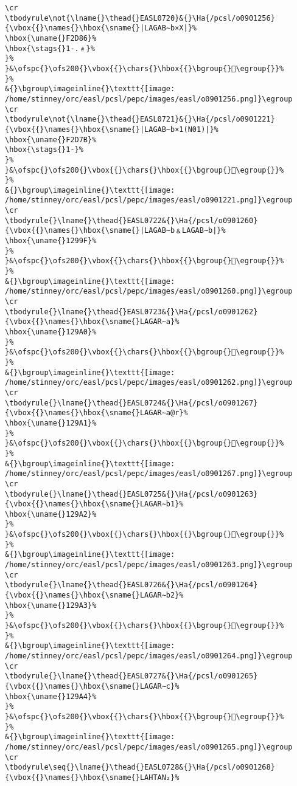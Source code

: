 \begin{verbatim}
\cr
\tbodyrule\not{\lname{}\thead{}EASL0720}&{}\Ha{/pcsl/o0901256}{\vbox{{}\names{}\hbox{\sname{}|LAGAB∼b×X|}%
\hbox{\uname{}F2D86}%
\hbox{\stags{}1-.﹟}%
}%
}&\ofspc{}\ofs200{}\vbox{{}\chars{}\hbox{{}\bgroup{}󲶆\egroup{}}%
}%
&{}\bgroup\imageinline{}\texttt{[image: /home/stinney/orc/easl/pcsl/pepc/images/easl/o0901256.png]}\egroup
\cr
\tbodyrule\not{\lname{}\thead{}EASL0721}&{}\Ha{/pcsl/o0901221}{\vbox{{}\names{}\hbox{\sname{}|LAGAB∼b×1(N01)|}%
\hbox{\uname{}F2D7B}%
\hbox{\stags{}1-}%
}%
}&\ofspc{}\ofs200{}\vbox{{}\chars{}\hbox{{}\bgroup{}󲵻\egroup{}}%
}%
&{}\bgroup\imageinline{}\texttt{[image: /home/stinney/orc/easl/pcsl/pepc/images/easl/o0901221.png]}\egroup
\cr
\tbodyrule{}\lname{}\thead{}EASL0722&{}\Ha{/pcsl/o0901260}{\vbox{{}\names{}\hbox{\sname{}|LAGAB∼b﹠LAGAB∼b|}%
\hbox{\uname{}1299F}%
}%
}&\ofspc{}\ofs200{}\vbox{{}\chars{}\hbox{{}\bgroup{}𒦟\egroup{}}%
}%
&{}\bgroup\imageinline{}\texttt{[image: /home/stinney/orc/easl/pcsl/pepc/images/easl/o0901260.png]}\egroup
\cr
\tbodyrule{}\lname{}\thead{}EASL0723&{}\Ha{/pcsl/o0901262}{\vbox{{}\names{}\hbox{\sname{}LAGAR∼a}%
\hbox{\uname{}129A0}%
}%
}&\ofspc{}\ofs200{}\vbox{{}\chars{}\hbox{{}\bgroup{}𒦠\egroup{}}%
}%
&{}\bgroup\imageinline{}\texttt{[image: /home/stinney/orc/easl/pcsl/pepc/images/easl/o0901262.png]}\egroup
\cr
\tbodyrule{}\lname{}\thead{}EASL0724&{}\Ha{/pcsl/o0901267}{\vbox{{}\names{}\hbox{\sname{}LAGAR∼a@r}%
\hbox{\uname{}129A1}%
}%
}&\ofspc{}\ofs200{}\vbox{{}\chars{}\hbox{{}\bgroup{}𒦡\egroup{}}%
}%
&{}\bgroup\imageinline{}\texttt{[image: /home/stinney/orc/easl/pcsl/pepc/images/easl/o0901267.png]}\egroup
\cr
\tbodyrule{}\lname{}\thead{}EASL0725&{}\Ha{/pcsl/o0901263}{\vbox{{}\names{}\hbox{\sname{}LAGAR∼b1}%
\hbox{\uname{}129A2}%
}%
}&\ofspc{}\ofs200{}\vbox{{}\chars{}\hbox{{}\bgroup{}𒦢\egroup{}}%
}%
&{}\bgroup\imageinline{}\texttt{[image: /home/stinney/orc/easl/pcsl/pepc/images/easl/o0901263.png]}\egroup
\cr
\tbodyrule{}\lname{}\thead{}EASL0726&{}\Ha{/pcsl/o0901264}{\vbox{{}\names{}\hbox{\sname{}LAGAR∼b2}%
\hbox{\uname{}129A3}%
}%
}&\ofspc{}\ofs200{}\vbox{{}\chars{}\hbox{{}\bgroup{}𒦣\egroup{}}%
}%
&{}\bgroup\imageinline{}\texttt{[image: /home/stinney/orc/easl/pcsl/pepc/images/easl/o0901264.png]}\egroup
\cr
\tbodyrule{}\lname{}\thead{}EASL0727&{}\Ha{/pcsl/o0901265}{\vbox{{}\names{}\hbox{\sname{}LAGAR∼c}%
\hbox{\uname{}129A4}%
}%
}&\ofspc{}\ofs200{}\vbox{{}\chars{}\hbox{{}\bgroup{}𒦤\egroup{}}%
}%
&{}\bgroup\imageinline{}\texttt{[image: /home/stinney/orc/easl/pcsl/pepc/images/easl/o0901265.png]}\egroup
\cr
\tbodyrule\seq{}\lname{}\thead{}EASL0728&{}\Ha{/pcsl/o0901268}{\vbox{{}\names{}\hbox{\sname{}LAHTAN₂}%

\end{verbatim}
